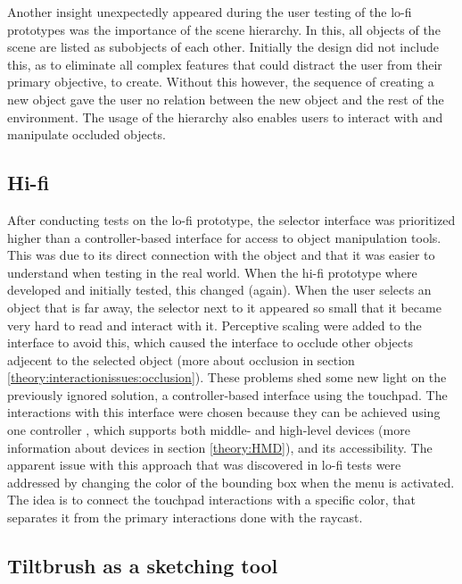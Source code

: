 Another insight unexpectedly appeared during the user testing of the lo-fi prototypes was the importance of the scene hierarchy. In this, all objects of the scene are listed as subobjects of each other. Initially the design did not include this, as to eliminate all complex features that could distract the user from their primary objective, to create. Without this however, the sequence of creating a new object gave the user no relation between the new object and the rest of the environment. The usage of the hierarchy also enables users to interact with and manipulate occluded objects.
\subsection{Hi-fi}
After conducting tests on the lo-fi prototype, the selector interface was prioritized higher than a controller-based interface for access to object manipulation tools. This was due to its direct connection with the object and that it was easier to understand when testing in the real world. When the hi-fi prototype where developed and initially tested, this changed (again). When the user selects an object that is far away, the selector next to it appeared so small that it became very hard to read and interact with it. Perceptive scaling were added to the interface to avoid this, which caused the interface to occlude other objects adjecent to the selected object (more about occlusion in section \ref{theory:interactionissues:occlusion}). These problems shed some new light on the previously ignored solution, a controller-based interface using the touchpad. The interactions with this interface were chosen because they can be achieved using one controller , which supports both middle- and high-level devices (more information about devices in section \ref{theory:HMD}), and its accessibility. The apparent issue with this approach that was discovered in lo-fi tests were addressed by changing the color of the bounding box when the menu is activated. The idea is to connect the touchpad interactions with a specific color, that separates it from the primary interactions done with the raycast.
\subsection{Tiltbrush as a sketching tool}
